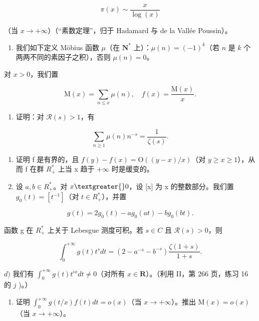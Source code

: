 \[
\pi (x) \sim \frac {x}{\log (x)}
\]

（当 \(x \to +\infty\)）（“素数定理”，归于 Hadamard 与 de la Vallée Poussin）。

\begin{enumerate}
\def\labelenumi{\arabic{enumi})}
\setcounter{enumi}{10}
\tightlist
\item
  我们如下定义 Möbius 函数 \(\mu\)（在 \(\mathbf{N}^*\) 上）：\(\mu(n) = (-1)^k\)（若 \(n\) 是 \(k\) 个两两不同的素因子之积），否则 \(\mu(n) = 0\)。
\end{enumerate}

对 \(x > 0\)，我们置

\[
\mathrm{M} (x) = \sum_ {n \leqslant x} \mu (n), \quad f (x) = \frac {\mathrm{M} (x)}{x}.
\]

\begin{enumerate}
\def\labelenumi{\alph{enumi})}
\tightlist
\item
  证明：对 \(\mathcal{R}(s) > 1\)，有
\end{enumerate}

\[
\sum_ {n \geqslant 1} \mu (n) n ^ {- s} = \frac {1}{\zeta (s)}.
\]

\begin{enumerate}
\def\labelenumi{\alph{enumi})}
\setcounter{enumi}{1}
\item
  证明 f 是有界的，且 \(f(y) - f(x) = \mathrm{O}((y - x)/x)\)（对 \(y \geqslant x \geqslant 1\)），从而 f 在群 \(R_{+}^{*}\) 上当 x 趋于 \(+\infty\) 时是缓变的。
\item
  设 \(a, b \in R_{+}^{*}\)。对 \(x \textgreater{} 0\)，设 {[}x{]} 为 x 的整数部分。我们置 \(g_{0}(t) = [t^{-1}]\)（对 \(t \in R_{+}^{*}\)），并置
\end{enumerate}

\[
g (t) = 2 g _ {0} (t) - a g _ {0} (a t) - b g _ {0} (b t).
\]

函数 g 在 \(R_{+}^{*}\) 上关于 Lebesgue 测度可积。若 \(s \in C\) 且 \(\mathcal{R}(s) > 0\)，则

\[
\int_ {0} ^ {+ \infty} g (t) t ^ {s} d t = (2 - a ^ {- s} - b ^ {- s}) \frac {\zeta (1 + s)}{1 + s}.
\]

\(d)\) 我们有 \(\int_{0}^{+\infty} g(t)t^{ix} dt \neq 0\)（对所有 \(x \in \mathbf{R}\)）。（利用 II，第 266 页，练习 16 的 \(j\) )。）

\begin{enumerate}
\def\labelenumi{\alph{enumi})}
\setcounter{enumi}{4}
\tightlist
\item
  证明 \(\int_0^{+\infty} g(t / x)f(t)dt = o(x)\)（当 \(x \to +\infty\)）。推出 \(\mathrm{M}(x) = o(x)\)（当 \(x \to +\infty\)）。
\end{enumerate}

